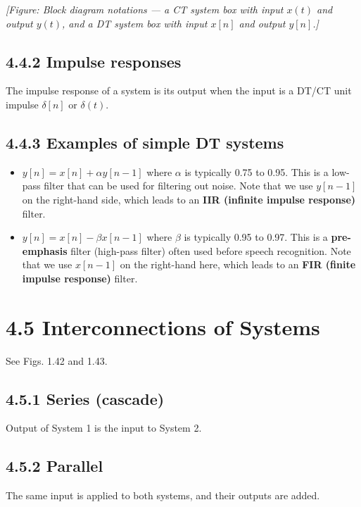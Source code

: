 \documentclass[11pt]{article}
\begin{document}
\textit{[Figure: Block diagram notations — a CT system box with input $x(t)$ and output $y(t)$, and a DT system box with input $x[n]$ and output $y[n]$.]}

\subsection*{4.4.2 Impulse responses}

The impulse response of a system is its output when the input is a DT/CT unit impulse $\delta[n]$ or $\delta(t)$.

\subsection*{4.4.3 Examples of simple DT systems}

\begin{itemize}
  \item $y[n] = x[n] + \alpha y[n-1]$ where $\alpha$ is typically 0.75 to 0.95. This is a low-pass filter that can be used for filtering out noise. Note that we use $y[n-1]$ on the right-hand side, which leads to an \textbf{IIR (infinite impulse response)} filter.
  \item $y[n] = x[n] - \beta x[n-1]$ where $\beta$ is typically 0.95 to 0.97. This is a \textbf{pre-emphasis} filter (high-pass filter) often used before speech recognition. Note that we use $x[n-1]$ on the right-hand here, which leads to an \textbf{FIR (finite impulse response)} filter.
\end{itemize}

\section*{4.5 Interconnections of Systems}

See Figs. 1.42 and 1.43.

\subsection*{4.5.1 Series (cascade)}

Output of System 1 is the input to System 2.

\subsection*{4.5.2 Parallel}

The same input is applied to both systems, and their outputs are added.
\end{document}
